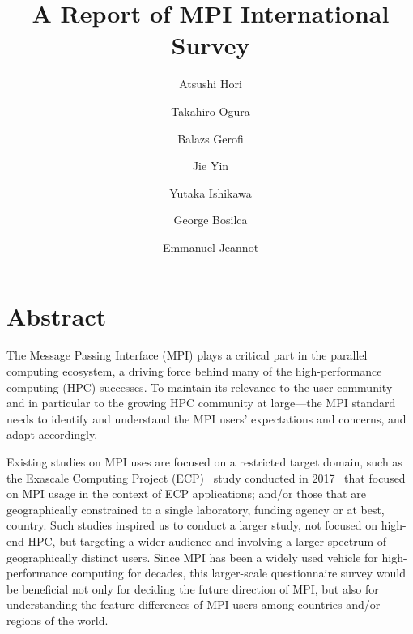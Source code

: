 \documentclass[sigconf,nonacm]{acmart}
\begin{document}
\title{A Report of MPI International Survey}

\author{Atsushi Hori}
\author{Takahiro Ogura}
\author{Balazs Gerofi}
\author{Jie Yin}
\author{Yutaka Ishikawa}

\author{George Bosilca}

\author{Emmanuel Jeannot}

\maketitle

\section{Abstract}

The Message Passing Interface (MPI) plays a critical part in the
parallel computing ecosystem, a driving force behind many of the
high-performance computing (HPC) successes. To maintain its relevance
to the user community---and in particular to the growing HPC community
at large---the MPI standard needs to identify and understand the MPI
users' expectations and concerns, and adapt accordingly.

%
Existing studies on MPI uses are focused on a restricted target domain,
such as the Exascale Computing Project (ECP)~\cite{ECP} study
conducted in 2017~\cite{osti_1462877} that focused 
on MPI usage in the context of ECP applications; and/or those that are
geographically 
constrained to a single laboratory, funding agency or at best, country.
%
Such studies inspired us to conduct a larger study, not focused on
high-end HPC, but targeting a wider audience and involving a larger
spectrum of geographically distinct users. Since MPI has been a widely
used vehicle for high-performance computing for decades, this
larger-scale questionnaire survey would be beneficial not only for
deciding the future direction of MPI, but also for understanding the
feature differences of MPI users among countries and/or regions of the
world.
\end{document}
